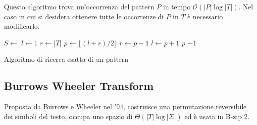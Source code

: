 Questo algoritmo trova un'occorrenza del pattern $P$ in tempo $\mathcal{O}(|P| \log |T|)$.
Nel caso in cui si desidera ottenere tutte le occorrenze di $P$ in $T$ è
necessario modificarlo.
\begin{algorithm}[!ht]
    \begin{algorithmic}
        \State $S \gets$ 
        \State $l \gets 1$
        \State $r \gets |T|$
        \State $p \gets \lfloor (l + r) / 2 \rfloor$
        \State $r \gets p - 1$
        \State $l \gets p + 1$
        \Else
        \State \Return $p$
        \EndIf
        \EndWhile
        \State \Return $-1$
        \EndFunction
    \end{algorithmic}
    \caption{Algoritmo di ricerca esatta di un pattern}
\end{algorithm}
\newpage
\subsection{Burrows Wheeler Transform}
Proposta da Burrows e Wheeler nel '94, costruisce una permutazione reversibile
dei simboli del testo, occupa uno spazio di $\Theta(|T| \log |\Sigma|)$ ed è
usata in B-zip 2.

